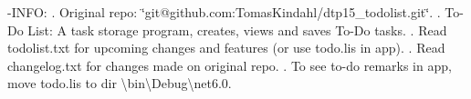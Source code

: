 -\/INFO\+: . Original repo\+: \char`\"{}git@github.\+com\+:\+Tomas\+Kindahl/dtp15\+\_\+todolist.\+git\char`\"{}. . To-\/\+Do List\+: A task storage program, creates, views and saves To-\/\+Do tasks. . Read \textquotesingle{}todolist.\+txt\textquotesingle{} for upcoming changes and features (or use todo.\+lis in app). . Read \textquotesingle{}changelog.\+txt\textquotesingle{} for changes made on original repo. . To see to-\/do remarks in app, move todo.\+lis to dir \textquotesingle{}\textbackslash{}bin\textbackslash{}\+Debug\textbackslash{}net6.0\textquotesingle{}. 